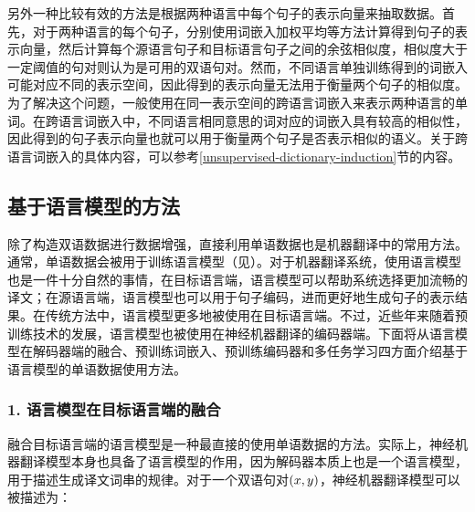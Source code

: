 \parinterval 另外一种比较有效的方法是根据两种语言中每个句子的表示向量来抽取数据。首先，对于两种语言的每个句子，分别使用词嵌入加权平均等方法计算得到句子的表示向量，然后计算每个源语言句子和目标语言句子之间的余弦相似度，相似度大于一定阈值的句对则认为是可用的双语句对。然而，不同语言单独训练得到的词嵌入可能对应不同的表示空间，因此得到的表示向量无法用于衡量两个句子的相似度。为了解决这个问题，一般使用在同一表示空间的跨语言词嵌入来表示两种语言的单词。在跨语言词嵌入中，不同语言相同意思的词对应的词嵌入具有较高的相似性，因此得到的句子表示向量也就可以用于衡量两个句子是否表示相似的语义。关于跨语言词嵌入的具体内容，可以参考\ref{unsupervised-dictionary-induction}节的内容。

\subsection{基于语言模型的方法}

\parinterval 除了构造双语数据进行数据增强，直接利用单语数据也是机器翻译中的常用方法。通常，单语数据会被用于训练语言模型（见{\chaptertwo}）。对于机器翻译系统，使用语言模型也是一件十分自然的事情，在目标语言端，语言模型可以帮助系统选择更加流畅的译文；在源语言端，语言模型也可以用于句子编码，进而更好地生成句子的表示结果。在传统方法中，语言模型更多地被使用在目标语言端。不过，近些年来随着预训练技术的发展，语言模型也被使用在神经机器翻译的编码器端。下面将从语言模型在解码器端的融合、预训练词嵌入、预训练编码器和多任务学习四方面介绍基于语言模型的单语数据使用方法。

\subsubsection{1. 语言模型在目标语言端的融合}

\parinterval 融合目标语言端的语言模型是一种最直接的使用单语数据的方法。实际上，神经机器翻译模型本身也具备了语言模型的作用，因为解码器本质上也是一个语言模型，用于描述生成译文词串的规律。对于一个双语句对$({x}, {y})$，神经机器翻译模型可以被描述为：

